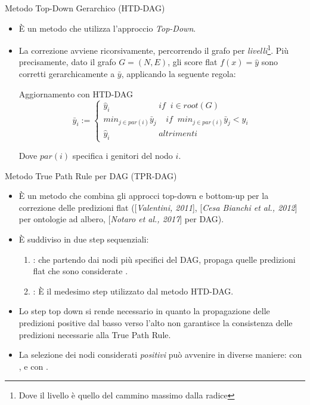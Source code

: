 \documentclass[9pt]{beamer}
\begin{document}
\begin{tframe}{Metodo Top-Down Gerarchico (HTD-DAG)}
\begin{itemize}

\item È un metodo che utilizza l'approccio \emph{Top-Down}.
\item La correzione avviene ricorsivamente, percorrendo il grafo per \emph{livelli}\footnote{\footnotesize{Dove il livello è quello del cammino massimo dalla radice}}. Più precisamente, dato il grafo $G = (N, E)$, gli score flat $f(x) = \hat{y}$ sono corretti gerarchicamente a $\bar{y}$, applicando la seguente regola:
\begin{block}{Aggiornamento con HTD-DAG}
\[
\bar{y}_i := 
\begin{cases}
\hat{y}_i \;\;\;\;\;\;\;\;\;\;\;\;\;\;\;\;\;\;\;\;\; if\;\; i \in root(G)\\
min_{j \in par(i)} \bar{y}_j \;\;\;\; if \;\; min_{j \in par(i)}\bar{y}_j < \hat{y}_i\\
\hat{y}_i \;\;\;\;\;\;\;\;\;\;\;\;\;\;\;\;\;\;\;\;\; altrimenti
\end{cases}
\]
\end{block}
Dove $par(i)$ specifica i genitori del nodo $i$.
\end{itemize} 
\end{tframe}

\begin{tframe}{Metodo True Path Rule per DAG (TPR-DAG)}
\begin{itemize}
\item È un metodo che combina gli approcci top-down e bottom-up per la correzione delle predizioni flat ([\emph{Valentini, 2011}], [\emph{Cesa Bianchi et al., 2012}] per ontologie ad albero, [\emph{Notaro et al., 2017}] per DAG). 
\item È suddiviso in due step sequenziali:
\begin{enumerate}
\item {}: che partendo dai nodi più specifici del DAG, propaga quelle predizioni flat che sono considerate .
\item {}: È il medesimo step utilizzato dal metodo HTD-DAG.
\end{enumerate}
\item Lo step top down si rende necessario in quanto la propagazione delle predizioni positive dal basso verso l’alto non garantisce la consistenza delle predizioni necessarie alla True Path Rule. 
\item La selezione dei nodi considerati \emph{positivi} può avvenire in diverse maniere: con ,  e con .
\end{itemize}
\end{tframe}
\end{document}
